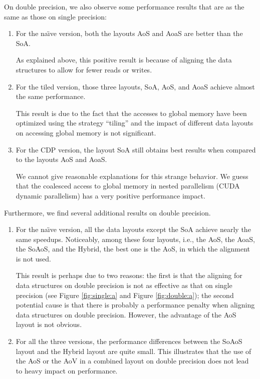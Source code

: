 On double precision, we also observe some performance results that are 
as the same as those on single precision:

\begin{enumerate}
\item For the na\"{\i}ve version, both the layouts AoS and AoaS are better than the SoA.

As explained above, this positive result is because of aligning the data 
structures to allow for fewer reads or writes. 

\item For the tiled version, those three layouts, SoA, AoS, and AoaS achieve almost the same performance. 

This result is due to the fact that the accesses to global memory have been 
optimized using the strategy ``tiling'' and the impact of different data 
layouts on accessing global memory is not significant. 


\item For the CDP version, the layout SoA still obtains best results when compared to the layouts AoS and AoaS.

We cannot give reasonable explanations for this strange behavior. We guess 
that the coalesced access to global memory in nested parallelism (CUDA 
dynamic parallelism) has a very positive performance impact. 

\end{enumerate}

Furthermore, we find several additional results on double precision. 

\begin{enumerate}
\item For the na\"{\i}ve version, all the data layouts except the SoA achieve nearly the same speedups. Noticeably, among these four layouts, i.e., the AoS, the AoaS, the SoAoS, and the Hybrid, the best one is the AoS, in which the alignment is not used. 

This result is perhaps due to two reasons: the first is that the aligning for data structures on double precision is not as effective as that on single precision (see Figure \ref{fig:single:a} and Figure \ref{fig:double:a}); the second potential cause is that there is probably a performance penalty when aligning data structures on double precision. However, the advantage of the AoS layout is not obvious.

\item For all the three versions, the performance differences between the SoAoS layout and the Hybrid layout are quite small. This illustrates that the use of the AoS or the AoV in a combined layout on double precision does not lead to heavy impact on performance. 
\end{enumerate}

